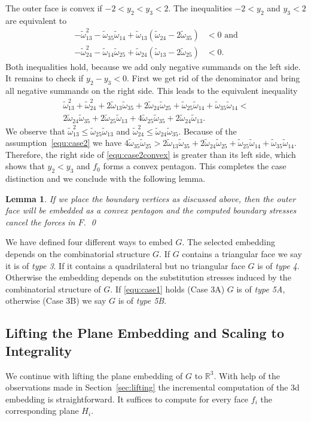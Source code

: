 \documentclass{article}
\theoremstyle{plain} \newtheorem{thm}{Theorem}[section]
\newtheorem{lem}{Lemma}[section]
\newcommand{\ot}{\tilde{\omega}}
\begin{document}
The outer face is convex if $-2<y_2<y_3<2$. 
The inequalities $-2<y_2$ and $y_3<2$ are equivalent to
\begin{align*}
-\ot_{13}^2-\ot_{35}\ot_{14}+\ot_{13}(\ot_{24}-2\ot_{35})&<0 
 \text{ and} \\
-\ot_{24}^2-\ot_{14}\ot_{25}+\ot_{24}(\ot_{13}-2\ot_{25})&<0.
\end{align*}
Both inequalities hold, because we add only negative summands on the left side.
It remains to check if $y_2-y_3<0$. First we get rid of the
denominator and bring all negative summands on the right side. This
leads to the equivalent inequality
\begin{multline}\label{equ:case2convex}
\ot_{13}^2+\ot_{24}^2+2\ot_{13}\ot_{35}+2\ot_{24}\ot_{25}+ \ot_{25}\ot_{14}+\ot_{35}\ot_{14}<\\
  2\ot_{24}\ot_{35}+2\ot_{25}\ot_{13}+4\ot_{25}\ot_{35}+2\ot_{24}\ot_{13}. 
\end{multline}
We observe that $\ot_{13}^2\leq\ot_{25}\ot_{13}$ and
$\ot_{24}^2\leq\ot_{24}\ot_{35}$. Because of  the assumption~\eqref{equ:case2} we have 
$4\ot_{35}\ot_{25}>2\ot_{13}\ot_{35}+2 \ot_{24}\ot_{25}+\ot_{25}\ot_{14}+\ot_{35}\ot_{14}$.
Therefore, the right side of \eqref{equ:case2convex} is greater than its left
side, which shows that $y_2<y_3$ and $f_0$ forms a convex pentagon.
This completes the case distinction and we conclude with the following lemma.
\begin{lem}
If we place the boundary vertices as
discussed above, then the outer face will be embedded as a convex pentagon and 
the computed boundary stresses cancel the forces in $F$.
\qed
\end{lem}

We have defined four different ways to embed $G$. The selected embedding
depends on the combinatorial structure $G$. If $G$ contains a
triangular face
we say it is of \textit{type 3}. If it contains a quadrilateral but
no triangular face $G$ is of \textit{type 4}. Otherwise the embedding
depends on the substitution stresses induced by the combinatorial structure of $G$. If
\eqref{equ:case1} holds (Case 3A) $G$ is
of \textit{type 5A}, otherwise (Case 3B) we say $G$ is of \textit{type 5B}. 

\subsection{Lifting the Plane Embedding and Scaling to Integrality}\label{sec:scaling}

We continue with lifting the plane embedding of
$G$ to $\mathbb{R}^3$. With help of the observations made in Section~\ref{sec:lifting} the incremental computation of the 3d embedding is straightforward. It suffices to compute for every face $f_{i}$ the corresponding plane $H_{i}$.
\end{document}
